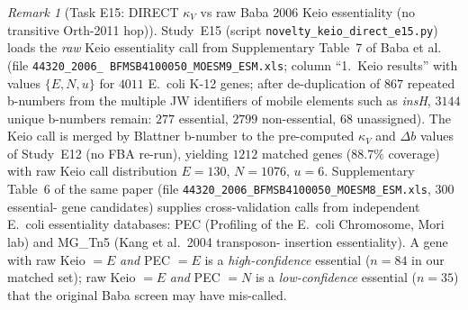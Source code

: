 \documentclass[11pt,a4paper]{article}
\theoremstyle{plain}
\theoremstyle{definition}
\theoremstyle{remark}
\newtheorem{remark}[theorem]{Remark}
\begin{document}
\begin{remark}[Task E15: DIRECT $\kappa_V$ vs raw Baba 2006 Keio
essentiality (no transitive Orth-2011 hop)]
\label{rem:e15-direct-keio}
Study~E15 (script \texttt{novelty\_keio\_direct\_e15.py}) loads the
\emph{raw} Keio essentiality call from Supplementary Table~7 of
Baba et al.~\cite{baba2006keio} (file \texttt{44320\_2006\_
BFMSB4100050\_MOESM9\_ESM.xls}; column ``1.~Keio results'' with values
$\{E, N, u\}$ for $4011$ E.~coli K-12 genes; after de-duplication of
$867$ repeated b-numbers from the multiple JW identifiers of mobile
elements such as \emph{insH}, $3144$ unique b-numbers remain: $277$
essential, $2799$ non-essential, $68$ unassigned). The Keio call is
merged by Blattner b-number to the pre-computed $\kappa_V$ and
$\Delta b$ values of Study~E12 (no FBA re-run), yielding $1212$ matched
genes ($88.7\%$ coverage) with raw Keio call distribution $E = 130$,
$N = 1076$, $u = 6$. Supplementary Table~6 of the same paper (file
\texttt{44320\_2006\_BFMSB4100050\_MOESM8\_ESM.xls}, $300$ essential-
gene candidates) supplies cross-validation calls from independent
E.~coli essentiality databases: PEC (Profiling of the E.~coli
Chromosome, Mori lab) and MG\_Tn5 (Kang et al.~2004 transposon-
insertion essentiality). A gene with raw Keio $= E$ \emph{and}
PEC $= E$ is a \emph{high-confidence} essential ($n = 84$ in our
matched set); raw Keio $= E$ \emph{and} PEC $= N$ is a
\emph{low-confidence} essential ($n = 35$) that the original Baba
screen may have mis-called.


\end{remark}
\end{document}
